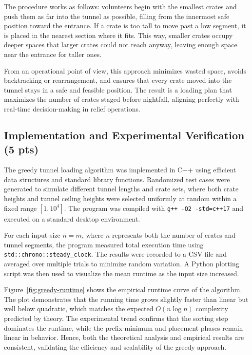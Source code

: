 \documentclass[sigconf]{acmart}
\begin{document}
The procedure works as follows: volunteers begin with the smallest crates and push them as far into the tunnel as possible, filling from the innermost safe position toward the entrance. If a crate is too tall to move past a low segment, it is placed in the nearest section where it fits. This way, smaller crates occupy deeper spaces that larger crates could not reach anyway, leaving enough space near the entrance for taller ones. 

From an operational point of view, this approach minimizes wasted space, avoids backtracking or rearrangement, and ensures that every crate moved into the tunnel stays in a safe and feasible position. The result is a loading plan that maximizes the number of crates staged before nightfall, aligning perfectly with real-time decision-making in relief operations.

\subsection{Implementation and Experimental Verification (5 pts)}
\label{subsec:implementation-greedy}
The greedy tunnel loading algorithm was implemented in C++ using efficient data structures and standard library functions. Randomized test cases were generated to simulate different tunnel lengths and crate sets, where both crate heights and tunnel ceiling heights were selected uniformly at random within a fixed range \([1, 10^4]\). The program was compiled with \texttt{g++ -O2 -std=c++17} and executed on a standard desktop environment.

For each input size \(n = m\), where \(n\) represents both the number of crates and tunnel segments, the program measured total execution time using \texttt{std::chrono::steady\_clock}. The results were recorded to a CSV file and averaged over multiple trials to minimize random variation. A Python plotting script was then used to visualize the mean runtime as the input size increased.

Figure~\ref{fig:greedy-runtime} shows the empirical runtime curve of the algorithm. The plot demonstrates that the running time grows slightly faster than linear but well below quadratic, which matches the expected \(O(n \log n)\) complexity predicted by theory. The experimental trend confirms that the sorting step dominates the runtime, while the prefix-minimum and placement phases remain linear in behavior. Hence, both the theoretical analysis and empirical results are consistent, validating the efficiency and scalability of the greedy approach.
\end{document}
